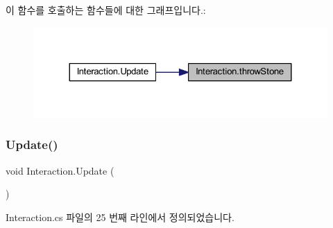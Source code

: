 이 함수를 호출하는 함수들에 대한 그래프입니다.\+:\nopagebreak
\begin{figure}[H]
\begin{center}
\leavevmode
\includegraphics[width=324pt]{d3/d8e/class_interaction_a306fd6f3cfc49c1a74221277785579ba_icgraph}
\end{center}
\end{figure}
\mbox{\label{class_interaction_a411a0868d034a972335ede1c42088c5e}} 
\subsubsection{\texorpdfstring{Update()}{Update()}}
{\footnotesize\ttfamily void Interaction.\+Update (\begin{DoxyParamCaption}{ }\end{DoxyParamCaption})\hspace{0.3cm}{\ttfamily [private]}}



Interaction.\+cs 파일의 25 번째 라인에서 정의되었습니다.


